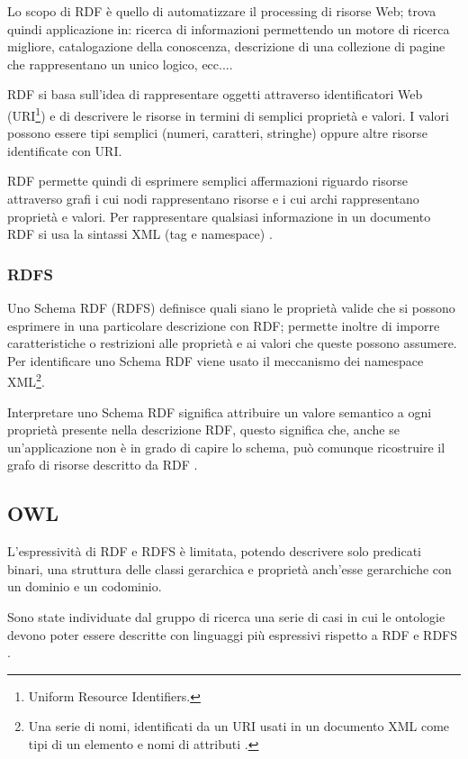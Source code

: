Lo scopo di RDF è quello di automatizzare il processing di risorse Web; trova quindi applicazione in: ricerca di informazioni permettendo un motore di ricerca migliore, catalogazione della conoscenza, descrizione di una collezione di pagine che rappresentano un unico  logico, ecc...\cite{brickley1998resource}.

RDF si basa sull'idea di rappresentare oggetti attraverso identificatori Web (URI\footnote{Uniform Resource Identifiers.}) e di descrivere le risorse in termini di semplici proprietà e valori. I valori possono essere tipi semplici (numeri, caratteri, stringhe) oppure altre risorse identificate con URI.

RDF permette quindi di esprimere semplici affermazioni riguardo risorse attraverso grafi i cui nodi rappresentano risorse e i cui archi rappresentano proprietà e valori. Per rappresentare qualsiasi informazione in un documento RDF si usa la sintassi XML (tag e namespace) \cite{manola2004rdf}.
\subsubsection{RDFS}
Uno Schema RDF (RDFS) definisce quali siano le proprietà valide che si possono esprimere in una particolare descrizione con RDF; permette inoltre di imporre caratteristiche o restrizioni alle proprietà e ai valori che queste possono assumere. Per identificare uno Schema RDF viene usato il meccanismo dei namespace XML\footnote{Una serie di nomi, identificati da un URI usati in un documento XML come tipi di un elemento e nomi di attributi \cite{bray1999namespaces}.}.

Interpretare uno Schema RDF significa attribuire un valore semantico a ogni proprietà presente nella descrizione RDF, questo significa che, anche se un'applicazione non è in grado di capire lo schema, può comunque ricostruire il grafo di risorse descritto da RDF \cite{miller1998introduction}.
\subsection{OWL}
L'espressività di RDF e RDFS è limitata, potendo descrivere solo predicati binari, una struttura delle classi gerarchica e proprietà anch'esse gerarchiche con un dominio e un codominio.

Sono state individuate dal gruppo di ricerca  una serie di casi in cui le ontologie devono poter essere descritte con linguaggi più espressivi rispetto a RDF e RDFS \cite{antoniou2009web}.

